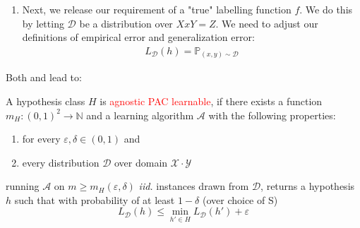 \documentclass[10pt,a4paper]{article}
\theoremstyle{definition}
\theoremstyle{plain}
\begin{document}
\begin{enumerate}
	\item[\protect\fbox{2}] Next, we release our requirement of a "true" labelling function $f$. We do this by letting $\mathcal{D}$ be a distribution over $X x Y = Z$. We need to adjust our definitions of empirical error and generalization error:
	\begin{eqnarray}
		L_{\mathcal{D}}(h) = \mathbb{P}_{(x, y) \sim \mathcal{D}}
	\end{eqnarray}
\end{enumerate}
Both \protect{} and \protect{} lead to:
\begin{boxeddef}
	A hypothesis class $H$ is \textcolor{red}{agnostic PAC learnable}, if there exists a function $m_H: (0,1)^2 \to \mathbb{N}$ and a learning algorithm $\mathcal{A}$ with the following properties:
	\begin{enumerate}
		\item for every $\varepsilon, \delta \in (0,1)$ and
		\item every distribution $\mathcal{D}$ over domain $\mathcal{X}\cdotp \mathcal{Y}$
	\end{enumerate}
	running $\mathcal{A}$ on $m \geq m_H(\varepsilon, \delta)$ \textit{iid.} instances drawn from $\mathcal{D}$, returns a hypothesis $h$ such that with probability of at least $1-\delta$ (over choice of S) 
	$$ L_{\mathcal{D}}(h) \leq \min_{h' \in H} L_{\mathcal{D}}(h') + \varepsilon$$
\end{boxeddef}
\end{document}
